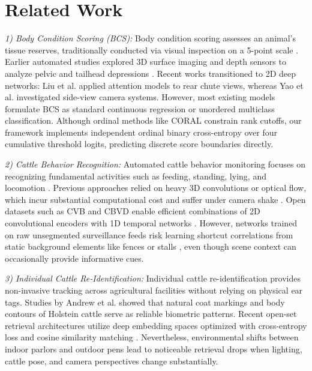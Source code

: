 \documentclass[conference]{IEEEtran}
\begin{document}
\section{Related Work}
\textit{1) Body Condition Scoring (BCS):} Body condition scoring assesses an animal's tissue reserves, traditionally conducted via visual inspection on a 5-point scale \cite{edmonson1989bcs, ferguson1994bcs}. Earlier automated studies explored 3D surface imaging and depth sensors to analyze pelvic and tailhead depressions \cite{rodriguez2018bcs}. Recent works transitioned to 2D deep networks: Liu et al. \cite{liu2025vets} applied attention models to rear chute views, whereas Yao et al. \cite{yao2026jds2} investigated side-view camera systems. However, most existing models formulate BCS as standard continuous regression or unordered multiclass classification. Although ordinal methods like CORAL \cite{coral2020} constrain rank cutoffs, our framework implements independent ordinal binary cross-entropy over four cumulative threshold logits, predicting discrete score boundaries directly.

\textit{2) Cattle Behavior Recognition:} Automated cattle behavior monitoring focuses on recognizing fundamental activities such as feeding, standing, lying, and locomotion \cite{weary2009understanding}. Previous approaches relied on heavy 3D convolutions or optical flow, which incur substantial computational cost and suffer under camera shake \cite{feichtenhofer2019slowfast}. Open datasets such as CVB \cite{zia2023cvb} and CBVD \cite{li2024cbvd5} enable efficient combinations of 2D convolutional encoders with 1D temporal networks \cite{bai2018tcn}. However, networks trained on raw unsegmented surveillance feeds risk learning shortcut correlations from static background elements like fences or stalls \cite{geirhos2020shortcut}, even though scene context can occasionally provide informative cues.

\textit{3) Individual Cattle Re-Identification:} Individual cattle re-identification provides non-invasive tracking across agricultural facilities without relying on physical ear tags. Studies by Andrew et al. \cite{andrew2017cattle, andrew2021opencows} showed that natural coat markings and body contours of Holstein cattle serve as reliable biometric patterns. Recent open-set retrieval architectures utilize deep embedding spaces optimized with cross-entropy loss and cosine similarity matching \cite{zhang2026beca}. Nevertheless, environmental shifts between indoor parlors and outdoor pens lead to noticeable retrieval drops when lighting, cattle pose, and camera perspectives change substantially.
\end{document}
